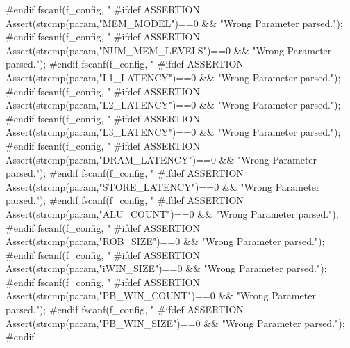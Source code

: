 \begin{DoxyCode}
{        #endif
        fscanf(f_config, "%
        #ifdef ASSERTION
        Assert(strcmp(param,"MEM_MODEL")==0 && "Wrong Parameter parsed.");
        #endif
        fscanf(f_config, "%
        #ifdef ASSERTION
        Assert(strcmp(param,"NUM_MEM_LEVELS")==0 && "Wrong Parameter parsed.");
        #endif
        fscanf(f_config, "%
        #ifdef ASSERTION
        Assert(strcmp(param,"L1_LATENCY")==0 && "Wrong Parameter parsed.");
        #endif
        fscanf(f_config, "%
        #ifdef ASSERTION
        Assert(strcmp(param,"L2_LATENCY")==0 && "Wrong Parameter parsed.");
        #endif
        fscanf(f_config, "%
        #ifdef ASSERTION
        Assert(strcmp(param,"L3_LATENCY")==0 && "Wrong Parameter parsed.");
        #endif
        fscanf(f_config, "%
        #ifdef ASSERTION
        Assert(strcmp(param,"DRAM_LATENCY")==0 && "Wrong Parameter parsed.");
        #endif
        fscanf(f_config, "%
        #ifdef ASSERTION
        Assert(strcmp(param,"STORE_LATENCY")==0 && "Wrong Parameter parsed.");
        #endif
        fscanf(f_config, "%
        #ifdef ASSERTION
        Assert(strcmp(param,"ALU_COUNT")==0 && "Wrong Parameter parsed.");
        #endif
        fscanf(f_config, "%
        #ifdef ASSERTION
        Assert(strcmp(param,"ROB_SIZE")==0 && "Wrong Parameter parsed.");
        #endif
        fscanf(f_config, "%
        #ifdef ASSERTION
        Assert(strcmp(param,"iWIN_SIZE")==0 && "Wrong Parameter parsed.");
        #endif
        fscanf(f_config, "%
        #ifdef ASSERTION
        Assert(strcmp(param,"PB_WIN_COUNT")==0 && "Wrong Parameter parsed.");
        #endif
        fscanf(f_config, "%
        #ifdef ASSERTION
        Assert(strcmp(param,"PB_WIN_SIZE")==0 && "Wrong Parameter parsed.");
        #endif

}
\end{DoxyCode}
